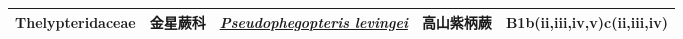 {\begin{longtable}{L{2.5cm}L{2cm}L{5cm}L{2.5cm}L{3cm}}
    Thelypteridaceae & 金星蕨科 & \href{http://www.theplantlist.org/tpl1.1/search?q=Pseudophegopteris+levingei}{\textit{Pseudophegopteris levingei} } & 高山紫柄蕨 & B1b(ii,iii,iv,v)c(ii,iii,iv)    \\
    \bottomrule
        \end{longtable}
        }
    